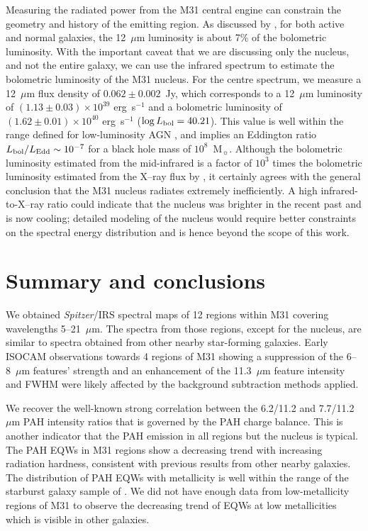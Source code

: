 \documentclass[useAMS,usenatbib,a4paper]{mn2e}
\begin{document}
Measuring the radiated power from the M31 central engine can constrain the geometry and history of the emitting region. 
As discussed by \citet{spinoglio95}, for both active and normal galaxies, the 12~$\mu$m luminosity 
is about 7\% of the bolometric luminosity. With the important caveat that we are discussing only the nucleus,
and not the entire galaxy, we  can use the infrared spectrum to estimate the bolometric luminosity  of the M31 nucleus.
For the centre spectrum, we measure a 12~$\mu$m flux density of 
$0.062 \pm 0.002$~Jy, which corresponds to a 12~$\mu$m luminosity of $(1.13\pm0.03) \times10^{39}$ erg~s$^{-1}$ and a bolometric luminosity
of  $(1.62\pm0.01) \times10^{40}$ erg~s$^{-1}$ ($\log L_{\rm bol} = 40.21$). 
This value is well within the range defined for low-luminosity AGN \citep[$\log L_{\rm bol} <42$,][]{Mason2012}, and
implies an Eddington ratio $L_{\rm bol}/L_{\rm Edd} \sim 10^{-7}$ for a black hole mass of $10^8$~M$_{\sun}$. 
Although the bolometric luminosity estimated from the mid-infrared is a factor of $10^3$ times the bolometric
luminosity estimated from the X--ray flux by \citet{Li09}, it certainly agrees with the general conclusion that the M31 nucleus radiates extremely inefficiently.
A high infrared-to-X--ray ratio could indicate that the nucleus was brighter in the recent past and is now cooling;
detailed modeling of the nucleus would require better constraints on the spectral energy distribution and is hence beyond the scope of this work.



\section{Summary and conclusions}
\label{sect:summary}

We  obtained {\em Spitzer}/IRS spectral maps of 12 regions within M31 covering wavelengths 5--21~$\mu$m. 
The spectra from those regions, except for the nucleus, are similar to spectra obtained from other nearby  star-forming galaxies. 
Early  ISOCAM observations towards 4 regions of M31 showing a suppression 
of the 6--8~$\mu$m features' strength and an enhancement of  the 11.3~$\mu$m feature intensity and FWHM \citep{1998Cesarsky} were likely affected by the background subtraction methods applied.

We recover the well-known strong correlation between the 6.2/11.2 and 7.7/11.2 $\mu$m PAH intensity ratios that is governed by the PAH charge balance.  This is another indicator that the PAH emission in all regions but the nucleus is typical. The PAH EQWs in M31 regions show a decreasing trend with increasing radiation hardness, consistent with previous 
results from other nearby galaxies. The distribution of PAH EQWs with metallicity is well within the range of the starburst galaxy sample of \citet{Engelbracht_2008}. 
We did not have enough data from low-metallicity regions of M31 to observe the decreasing trend of EQWs at low metallicities which is visible in other galaxies.
\end{document}
